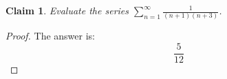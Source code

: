 \documentclass{article}
\newtheorem{theorem}{Claim}
\begin{document}
\begin{theorem}
Evaluate the series $\sum\limits_{n=1}^\infty\frac{1}{(n+1)(n+3)}$.
\end{theorem}

\begin{proof}
The answer is:
\[
\frac{5}{12}
\]
\end{proof}
\end{document}
